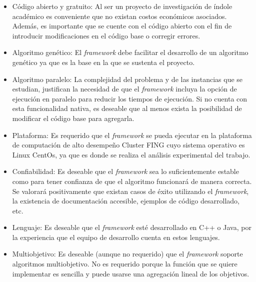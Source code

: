 \begin{itemize}
	\item Código abierto y gratuito: Al ser un proyecto de investigación de índole académico es conveniente que no existan costos económicos asociados. Además, es importante que se cuente con el código abierto con el fin de introducir modificaciones en el código base o corregir errores.
	\item Algoritmo genético: El \emph{framework} debe facilitar el desarrollo de un algoritmo genético ya que es la base en la que se sustenta el proyecto.
	\item Algoritmo paralelo: La complejidad del problema y de las instancias que se estudian, justifican la necesidad de que el \emph{framework} incluya la opción de ejecución en paralelo para reducir los tiempos de ejecución. Si no cuenta con esta funcionalidad nativa, es deseable que al menos exista la posibilidad de modificar el código base para agregarla.
	\item Plataforma: Es requerido que el \emph{framework} se pueda ejecutar en la plataforma de computación de alto desempeño Cluster FING cuyo sistema operativo es Linux CentOs, ya que es donde se realiza el análisis experimental del trabajo. 
	\item Confiabilidad: Es deseable que el \emph{framework} sea lo suficientemente estable como para tener confianza de que el algoritmo funcionará de manera correcta. Se valorará positivamente que existan casos de éxito utilizando el \emph{framework}, la existencia de documentación accesible, ejemplos de código desarrollado, etc.
	\item Lenguaje: Es deseable que el \emph{framework} esté desarrollado en C++ o Java, por la experiencia que el equipo de desarrollo cuenta en estos lenguajes. 
	\item Multiobjetivo: Es deseable (aunque no requerido) que el \emph{framework} soporte algoritmos multiobjetivo. No es requerido porque la función que se quiere implementar es sencilla y puede usarse una agregación lineal de los objetivos.
\end{itemize} 

